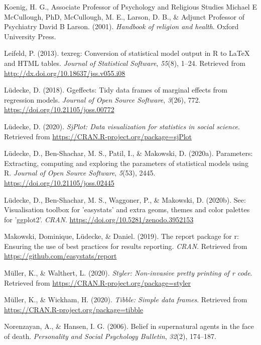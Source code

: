 \documentclass[
  english,
  man,floatsintext]{apa6}
\begin{document}
\leavevmode\hypertarget{ref-Koenig2001-ow}{}%
Koenig, H. G., Associate Professor of Psychology and Religious Studies Michael E McCullough, PhD, McCullough, M. E., Larson, D. B., \& Adjunct Professor of Psychiatry David B Larson. (2001). \emph{Handbook of religion and health}. Oxford University Press.

\leavevmode\hypertarget{ref-R-texreg}{}%
Leifeld, P. (2013). texreg: Conversion of statistical model output in R to LaTeX and HTML tables. \emph{Journal of Statistical Software}, \emph{55}(8), 1--24. Retrieved from \url{http://dx.doi.org/10.18637/jss.v055.i08}

\leavevmode\hypertarget{ref-R-ggeffects}{}%
Lüdecke, D. (2018). Ggeffects: Tidy data frames of marginal effects from regression models. \emph{Journal of Open Source Software}, \emph{3}(26), 772. \url{https://doi.org/10.21105/joss.00772}

\leavevmode\hypertarget{ref-R-sjPlot}{}%
Lüdecke, D. (2020). \emph{SjPlot: Data visualization for statistics in social science}. Retrieved from \url{https://CRAN.R-project.org/package=sjPlot}

\leavevmode\hypertarget{ref-R-parameters}{}%
Lüdecke, D., Ben-Shachar, M. S., Patil, I., \& Makowski, D. (2020a). Parameters: Extracting, computing and exploring the parameters of statistical models using R. \emph{Journal of Open Source Software}, \emph{5}(53), 2445. \url{https://doi.org/10.21105/joss.02445}

\leavevmode\hypertarget{ref-R-see}{}%
Lüdecke, D., Ben-Shachar, M. S., Waggoner, P., \& Makowski, D. (2020b). See: Visualisation toolbox for 'easystats' and extra geoms, themes and color palettes for 'ggplot2'. \emph{CRAN}. \url{https://doi.org/10.5281/zenodo.3952153}

\leavevmode\hypertarget{ref-R-report}{}%
Makowski, Dominique, Lüdecke, \& Daniel. (2019). The report package for r: Ensuring the use of best practices for results reporting. \emph{CRAN}. Retrieved from \url{https://github.com/easystats/report}

\leavevmode\hypertarget{ref-R-styler}{}%
Müller, K., \& Walthert, L. (2020). \emph{Styler: Non-invasive pretty printing of r code}. Retrieved from \url{https://CRAN.R-project.org/package=styler}

\leavevmode\hypertarget{ref-R-tibble}{}%
Müller, K., \& Wickham, H. (2020). \emph{Tibble: Simple data frames}. Retrieved from \url{https://CRAN.R-project.org/package=tibble}

\leavevmode\hypertarget{ref-norenzayan2006belief}{}%
Norenzayan, A., \& Hansen, I. G. (2006). Belief in supernatural agents in the face of death. \emph{Personality and Social Psychology Bulletin}, \emph{32}(2), 174--187.
\end{document}
